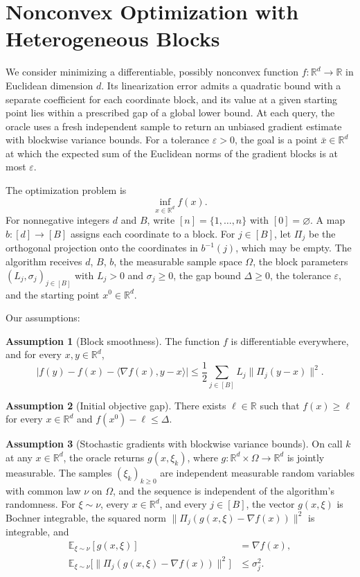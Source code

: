 \documentclass[10pt]{article}
\theoremstyle{definition}
\newtheorem{assumption}{Assumption}
\begin{document}
\section*{Nonconvex Optimization with Heterogeneous Blocks}
We consider minimizing a differentiable, possibly nonconvex function $f:\mathbb{R}^d\to\mathbb{R}$ in Euclidean dimension $d$. Its linearization error admits a quadratic bound with a separate coefficient for each coordinate block, and its value at a given starting point lies within a prescribed gap of a global lower bound. At each query, the oracle uses a fresh independent sample to return an unbiased gradient estimate with blockwise variance bounds. For a tolerance $\varepsilon>0$, the goal is a point $\bar{x}\in\mathbb{R}^d$ at which the expected sum of the Euclidean norms of the gradient blocks is at most $\varepsilon$.

The optimization problem is
\[
\inf_{x\in\mathbb{R}^d} f(x).
\]
For nonnegative integers $d$ and $B$, write $[n]=\{1,\ldots,n\}$ with $[0]=\varnothing$. A map $b:[d]\to[B]$ assigns each coordinate to a block. For $j\in[B]$, let $\Pi_j$ be the orthogonal projection onto the coordinates in $b^{-1}(j)$, which may be empty. The algorithm receives $d$, $B$, $b$, the measurable sample space $\Omega$, the block parameters $(L_j,\sigma_j)_{j\in[B]}$ with $L_j>0$ and $\sigma_j\geq0$, the gap bound $\Delta\geq0$, the tolerance $\varepsilon$, and the starting point $x^0\in\mathbb{R}^d$.

Our assumptions:
\begin{assumption}[Block smoothness]
The function $f$ is differentiable everywhere, and for every $x,y\in\mathbb{R}^d$,
\[
\bigl|f(y)-f(x)-\langle\nabla f(x),y-x\rangle\bigr|
\leq \frac{1}{2}\sum_{j\in[B]}L_j\|\Pi_j(y-x)\|^2.
\]
\end{assumption}

\begin{assumption}[Initial objective gap]
There exists $\ell\in\mathbb{R}$ such that $f(x)\geq\ell$ for every $x\in\mathbb{R}^d$ and $f(x^0)-\ell\leq\Delta$.
\end{assumption}

\begin{assumption}[Stochastic gradients with blockwise variance bounds]
On call $k$ at any $x\in\mathbb{R}^d$, the oracle returns $g(x,\xi_k)$, where $g:\mathbb{R}^d\times\Omega\to\mathbb{R}^d$ is jointly measurable. The samples $(\xi_k)_{k\geq0}$ are independent measurable random variables with common law $\nu$ on $\Omega$, and the sequence is independent of the algorithm's randomness. For $\xi\sim\nu$, every $x\in\mathbb{R}^d$, and every $j\in[B]$, the vector $g(x,\xi)$ is Bochner integrable, the squared norm $\|\Pi_j(g(x,\xi)-\nabla f(x))\|^2$ is integrable, and
\[
\begin{aligned}
\mathbb{E}_{\xi\sim\nu}[g(x,\xi)] &= \nabla f(x),\\
\mathbb{E}_{\xi\sim\nu}\bigl[\|\Pi_j(g(x,\xi)-\nabla f(x))\|^2\bigr] &\leq \sigma_j^2.
\end{aligned}
\]
\end{assumption}
\end{document}

